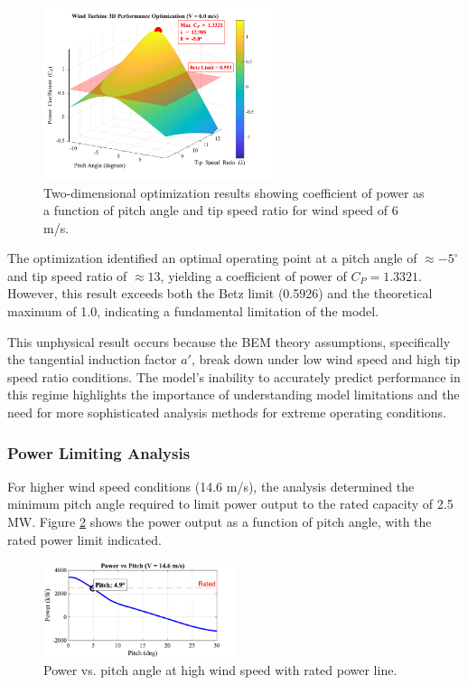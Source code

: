 \documentclass[11pt]{article}
\begin{document}
\begin{figure}[H]
  \centering
  \includegraphics[width=0.6\textwidth]{media/2D_CP_Optimization_Results.png}
  \caption{Two-dimensional optimization results showing coefficient of power as a function of pitch angle and tip speed ratio for wind speed of 6 m/s.}
  \label{fig:cp_2d}
\end{figure}

The optimization identified an optimal operating point at a pitch angle of $\approx -5^{\circ}$ and tip speed ratio of $\approx 13$, yielding a coefficient of power of $C_P = 1.3321$. However, this result exceeds both the Betz limit (0.5926) and the theoretical maximum of 1.0, indicating a fundamental limitation of the model.

This unphysical result occurs because the BEM theory assumptions, specifically the tangential induction factor $a'$, break down under low wind speed and high tip speed ratio conditions. The model's inability to accurately predict performance in this regime highlights the importance of understanding model limitations and the need for more sophisticated analysis methods for extreme operating conditions.
\subsubsection{Power Limiting Analysis}

For higher wind speed conditions (14.6 m/s), the analysis determined the minimum pitch angle required to limit power output to the rated capacity of 2.5 MW. Figure \ref{fig:power_vs_pitch} shows the power output as a function of pitch angle, with the rated power limit indicated.

\begin{figure}[H]
  \centering
  \includegraphics[width=0.5\textwidth]{media/Deliverable4_Power_vs_Pitch.png}
  \caption{Power vs. pitch angle at high wind speed with rated power line.}
  \label{fig:power_vs_pitch}
\end{figure}
\end{document}
